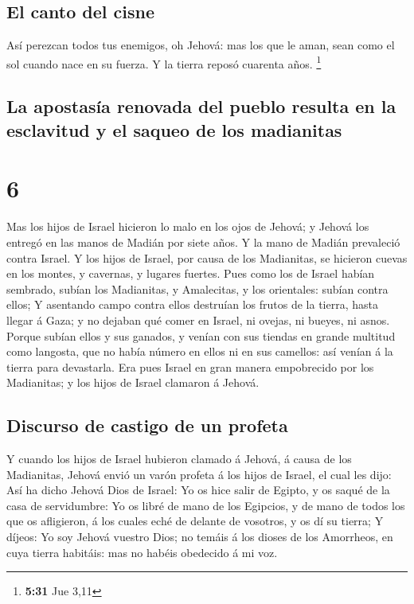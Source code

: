 \hypertarget{el-canto-del-cisne}{%
\subsection{El canto del cisne}\label{el-canto-del-cisne}}

 Así perezcan todos tus enemigos, oh Jehová: mas los que le
aman, sean como el sol cuando nace en su fuerza. Y la tierra reposó
cuarenta años. \footnote{\textbf{5:31} Jue 3,11}

\hypertarget{la-apostasuxeda-renovada-del-pueblo-resulta-en-la-esclavitud-y-el-saqueo-de-los-madianitas}{%
\subsection{La apostasía renovada del pueblo resulta en la esclavitud y
el saqueo de los
madianitas}\label{la-apostasuxeda-renovada-del-pueblo-resulta-en-la-esclavitud-y-el-saqueo-de-los-madianitas}}

\hypertarget{section-5}{%
\section{6}\label{section-5}}

 Mas los hijos de Israel hicieron lo malo en los ojos de
Jehová; y Jehová los entregó en las manos de Madián por siete años.
 Y la mano de Madián prevaleció contra Israel. Y los hijos
de Israel, por causa de los Madianitas, se hicieron cuevas en los
montes, y cavernas, y lugares fuertes.  Pues como los de
Israel habían sembrado, subían los Madianitas, y Amalecitas, y los
orientales: subían contra ellos;  Y asentando campo contra
ellos destruían los frutos de la tierra, hasta llegar á Gaza; y no
dejaban qué comer en Israel, ni ovejas, ni bueyes, ni asnos.
 Porque subían ellos y sus ganados, y venían con sus tiendas
en grande multitud como langosta, que no había número en ellos ni en sus
camellos: así venían á la tierra para devastarla.  Era pues
Israel en gran manera empobrecido por los Madianitas; y los hijos de
Israel clamaron á Jehová.

\hypertarget{discurso-de-castigo-de-un-profeta}{%
\subsection{Discurso de castigo de un
profeta}\label{discurso-de-castigo-de-un-profeta}}

 Y cuando los hijos de Israel hubieron clamado á Jehová, á
causa de los Madianitas,  Jehová envió un varón profeta á
los hijos de Israel, el cual les dijo: Así ha dicho Jehová Dios de
Israel: Yo os hice salir de Egipto, y os saqué de la casa de
servidumbre:  Yo os libré de mano de los Egipcios, y de mano
de todos los que os afligieron, á los cuales eché de delante de
vosotros, y os dí su tierra;  Y díjeos: Yo soy Jehová
vuestro Dios; no temáis á los dioses de los Amorrheos, en cuya tierra
habitáis: mas no habéis obedecido á mi voz.

